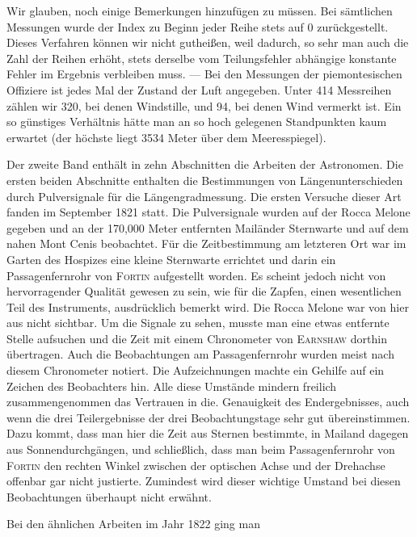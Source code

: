 \par
{}%
Wir glauben, noch einige Bemerkungen hinzufügen zu müssen. Bei sämtlichen Messungen wurde der Index zu Beginn jeder Reihe stets auf 0 zurückgestellt. Dieses Verfahren können wir nicht gutheißen, weil dadurch, so sehr man auch die Zahl der Reihen erhöht, stets derselbe vom Teilungsfehler abhängige konstante Fehler im Ergebnis verbleiben muss. --- Bei den Messungen der piemontesischen Offiziere ist jedes Mal der Zustand der Luft angegeben. Unter 414 Messreihen zählen wir 320, bei denen Windstille, und 94, bei denen Wind vermerkt ist. Ein so günstiges Verhältnis hätte man an so hoch gelegenen Standpunkten kaum erwartet (der höchste liegt 3534 Meter über dem Meeresspiegel).

Der zweite Band enthält in zehn Abschnitten die Arbeiten der Astronomen. Die ersten beiden Abschnitte enthalten die Bestimmungen von Längenunterschieden durch Pulversignale für die Längengradmessung. Die ersten Versuche dieser Art fanden im September 1821 statt. Die Pulversignale wurden auf der Rocca Melone gegeben und an der 170,000 Meter entfernten Mailänder Sternwarte und auf dem nahen Mont Cenis beobachtet. Für die Zeitbestimmung am letzteren Ort war im Garten des Hospizes eine kleine Sternwarte errichtet und darin ein Passagenfernrohr von \textsc{Fortin} aufgestellt worden. Es scheint jedoch nicht von hervorragender Qualität gewesen zu sein, wie für die Zapfen, einen wesentlichen Teil des Instruments, ausdrücklich bemerkt wird. Die Rocca Melone war von hier aus nicht sichtbar. Um die Signale zu sehen, musste man eine etwas entfernte Stelle aufsuchen und die Zeit mit einem Chronometer von \textsc{Earnshaw} dorthin übertragen. Auch die Beobachtungen am Passagenfernrohr wurden meist nach diesem Chronometer notiert. Die Aufzeichnungen machte ein Gehilfe auf ein Zeichen des Beobachters hin. Alle diese Umstände mindern freilich zusammengenommen das Vertrauen in die. Genauigkeit des Endergebnisses, auch wenn die drei Teilergebnisse der drei Beobachtungstage sehr gut übereinstimmen. Dazu kommt, dass man hier die Zeit aus Sternen bestimmte, in Mailand dagegen aus Sonnendurchgängen, und schließlich, dass man beim Passagenfernrohr von \textsc{Fortin} den rechten Winkel zwischen der optischen Achse und der Drehachse offenbar gar nicht justierte. Zumindest wird dieser wichtige Umstand bei diesen Beobachtungen überhaupt nicht erwähnt.

Bei den ähnlichen Arbeiten im Jahr 1822 ging man
